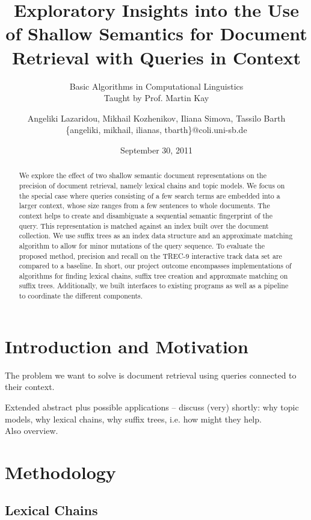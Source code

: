 \documentclass[11pt, a4paper, abstraction]{scrartcl}
\title{Exploratory Insights into the Use of Shallow Semantics for Document Retrieval with Queries in Context}
\author{Angeliki Lazaridou, Mikhail Kozhenikov, Iliana Simova, Tassilo Barth \\\{angeliki, mikhail, ilianas, tbarth\}@coli.uni-sb.de}
\date{September 30, 2011}
\subtitle{Basic Algorithms in Computational Linguistics \\ %
		Taught by Prof. Martin Kay}
\begin{document}
\maketitle

\begin{abstract}
We explore the effect of two shallow semantic document representations on the precision of document retrieval, namely lexical chains and topic models. We focus on the special case where queries consisting of a few search terms are embedded into a larger context, whose size ranges from a few sentences to whole documents. The context helps to create and disambiguate a sequential semantic fingerprint of the query. This representation is matched against an index built over the document collection. We use suffix trees as an index data structure and an approximate matching algorithm to allow for minor mutations of the query sequence. To evaluate the proposed method, precision and recall on the TREC-9 interactive track data set are compared to a baseline. In short, our project outcome encompasses implementations of algorithms for finding lexical chains, suffix tree creation and approxmate matching on suffix trees. Additionally, we built interfaces to existing programs as well as a pipeline to coordinate the different components.
\end{abstract}

\newpage

\tableofcontents

\newpage

\section{Introduction and Motivation}

The problem we want to solve is document retrieval using queries connected to their context.   

Extended abstract plus possible applications -- discuss (very) shortly: why topic models, why lexical chains, why suffix trees, i.e. how might they help. \\
Also overview.

\section{Methodology}

\subsection{Lexical Chains}
\end{document}
